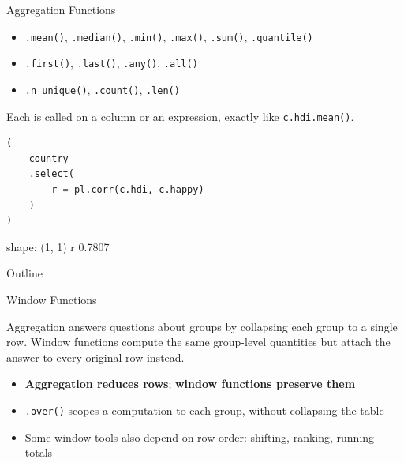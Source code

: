 \documentclass[8pt,aspectratio=169]{beamer}
\begin{document}
\begin{frame}[fragile]{Aggregation Functions}
\begin{splitcode}{%

\begin{itemize}
\item \texttt{.mean()}, \texttt{.median()}, \texttt{.min()}, \texttt{.max()}, \texttt{.sum()}, \texttt{.quantile()}
\item \texttt{.first()}, \texttt{.last()}, \texttt{.any()}, \texttt{.all()}
\item \texttt{.n\_unique()}, \texttt{.count()}, \texttt{.len()}
\end{itemize}

Each is called on a column or an expression, exactly like \texttt{c.hdi.mean()}.

}
\begin{lstlisting}[language=Python]
(
    country
    .select(
        r = pl.corr(c.hdi, c.happy)
    )
)
\end{lstlisting}
\begin{codeoutput}
shape: (1, 1)
r
0.7807
\end{codeoutput}
\end{splitcode}
\end{frame}

\begin{outlineframe}{Outline}
\end{outlineframe}

\begin{textframe}{Window Functions}

Aggregation answers questions about groups by collapsing each group to a single row. Window functions compute the same group-level quantities but attach the answer to every original row instead.

\begin{itemize}
\item \textbf{Aggregation reduces rows}; \textbf{window functions preserve them}
\item \texttt{.over()} scopes a computation to each group, without collapsing the table
\item Some window tools also depend on row order: shifting, ranking, running totals
\end{itemize}

\end{textframe}
\end{document}
